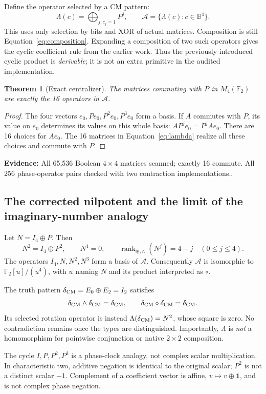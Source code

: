 \documentclass[11pt,a4paper]{article}
\newtheorem{theorem}{Theorem}[section]
\theoremstyle{definition}\newtheorem{definition}[theorem]{Definition}
\newcommand{\F}{\mathbb F_2}
\newcommand{\A}{\mathcal A}
\newcommand{\B}{\mathbb B}
\newcommand{\rk}{\operatorname{rank}_{\oplus,\wedge}}
\newcommand{\ev}[1]{\textbf{Evidence:} #1.}
\begin{document}
Define the operator selected by a CM pattern:
\begin{equation}
 \Lambda(c)=\bigoplus_{j:c_j=1}P^j,
 \qquad \A=\{\Lambda(c):c\in\B^4\}.
 \label{eq:lambda}
\end{equation}
This uses only selection by bits and XOR of actual matrices. Composition is still Equation~\eqref{eq:composition}. Expanding a composition of two such operators gives the cyclic coefficient rule from the earlier work. Thus the previously introduced cyclic product is \emph{derivable}; it is not an extra primitive in the audited implementation.

\begin{theorem}[Exact centralizer]
The matrices commuting with $P$ in $M_4(\F)$ are exactly the 16 operators in $\A$.
\end{theorem}
\begin{proof}
The four vectors $e_0,P e_0,P^2 e_0,P^3 e_0$ form a basis. If $A$ commutes with $P$, its value on $e_0$ determines its values on this whole basis: $A P^j e_0=P^j A e_0$. There are 16 choices for $A e_0$. The 16 matrices in Equation~\eqref{eq:lambda} realize all these choices and commute with $P$.
\end{proof}
\ev{All 65,536 Boolean $4\times4$ matrices scanned; exactly 16 commute. All 256 phase-operator pairs checked with two contraction implementations.}

\subsection{The corrected nilpotent and the limit of the imaginary-number analogy}
Let $N=I_4\oplus P$. Then
\[
 N^2=I_4\oplus P^2,\qquad N^4=0,
 \qquad \rk(N^j)=4-j\quad (0\le j\le4).
\]
The operators $I_4,N,N^2,N^3$ form a basis of $\A$. Consequently $\A$ is isomorphic to $\F[u]/(u^4)$, with $u$ naming $N$ and its product interpreted as $\circ$.

The truth pattern $\delta_{\rm CM}=E_0\oplus E_2=I_2$ satisfies
\[
 \delta_{\rm CM}\wedge\delta_{\rm CM}=\delta_{\rm CM},\qquad
 \delta_{\rm CM}\circ\delta_{\rm CM}=\delta_{\rm CM}.
\]
Its selected rotation operator is instead $\Lambda(\delta_{\rm CM})=N^2$, whose square is zero. No contradiction remains once the types are distinguished. Importantly, $\Lambda$ is \emph{not} a homomorphism for pointwise conjunction or native $2\times2$ composition.

The cycle $I,P,P^2,P^3$ is a phase-clock analogy, not complex scalar multiplication. In characteristic two, additive negation is identical to the original scalar; $P^2$ is not a distinct scalar $-1$. Complement of a coefficient vector is affine, $v\mapsto v\oplus\mathbf1$, and is not complex phase negation.
\end{document}
